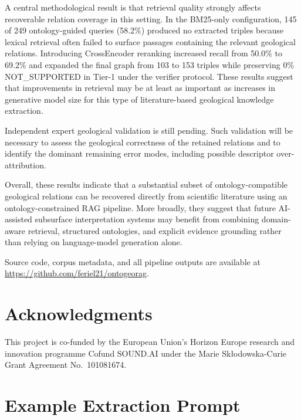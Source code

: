 \documentclass[10pt]{article}
\begin{document}
A central methodological result is that retrieval quality strongly
affects recoverable relation coverage in this setting.
In the BM25-only configuration, 145 of 249 ontology-guided queries
(58.2\%) produced no extracted triples because lexical retrieval often
failed to surface passages containing the relevant geological
relations.
Introducing CrossEncoder reranking increased recall from 50.0\% to
69.2\% and expanded the final graph from 103 to 153 triples while
preserving 0\% NOT\_SUPPORTED in Tier-1 under the verifier protocol.
These results suggest that improvements in retrieval may be at least
as important as increases in generative model size for this type of
literature-based geological knowledge extraction.

Independent expert geological validation is still pending.
Such validation will be necessary to assess the geological correctness
of the retained relations and to identify the dominant remaining error
modes, including possible descriptor over-attribution.

Overall, these results indicate that a substantial subset of
ontology-compatible geological relations can be recovered directly
from scientific literature using an ontology-constrained RAG
pipeline.
More broadly, they suggest that future AI-assisted subsurface
interpretation systems may benefit from combining domain-aware
retrieval, structured ontologies, and explicit evidence grounding
rather than relying on language-model generation alone.

\medskip
\noindent Source code, corpus metadata, and all pipeline outputs
are available at \url{https://github.com/feriel21/ontogeorag}.

\section*{Acknowledgments}

This project is co-funded by the European Union's Horizon Europe
research and innovation programme Cofund SOUND.AI under the
Marie Sk\l{}odowska-Curie Grant Agreement No.~101081674.






\appendix
\section{Example Extraction Prompt}
\label{app:prompts}
\end{document}

